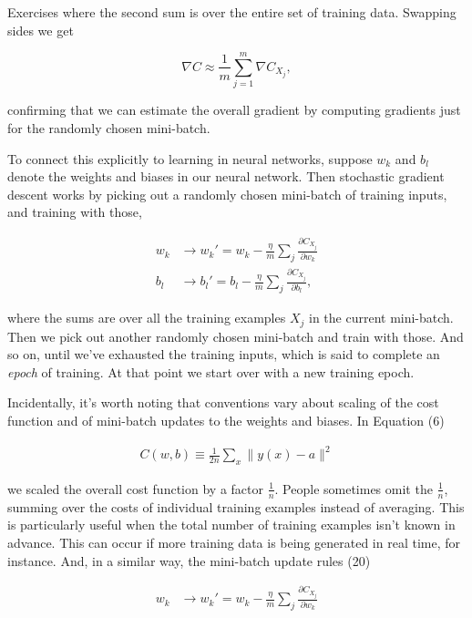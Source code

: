 \begin{exerciseBox}{Exercises}
\noindent where the second sum is over the entire set of training data. Swapping sides we get

\begin{equation}
\nabla C \approx \frac{1}{m} \sum_{j=1}^m \nabla C_{X_{j}},
\tag{19}
\end{equation}

\noindent confirming that we can estimate the overall gradient by computing gradients just for the randomly chosen mini-batch.


To connect this explicitly to learning in neural networks, suppose $w_k$ and $b_l$ denote the weights and biases in our neural network. Then stochastic gradient descent works by picking out a randomly chosen mini-batch of training inputs, and training with those,

\begin{align}
w_k &\rightarrow w_k' = w_k-\frac{\eta}{m} \sum_j \frac{\partial C_{X_j}}{\partial w_k} \tag{20} \\ b_l &\rightarrow b_l' = b_l-\frac{\eta}{m} \sum_j \frac{\partial C_{X_j}}{\partial b_l}, \tag{21}
\end{align}

\noindent where the sums are over all the training examples $X_j$ in the current mini-batch. Then we pick out another randomly chosen mini-batch and train with those. And so on, until we've exhausted the training inputs, which is said to complete an \emph{epoch} of training. At that point we start over with a new training epoch.


Incidentally, it's worth noting that conventions vary about scaling of the cost function and of mini-batch updates to the weights and biases. In Equation (6)

\begin{align*}
C(w,b) \equiv \frac{1}{2n} \sum_x \| y(x) - a\|^2 \nonumber
\end{align*}

\noindent we scaled the overall cost function by a factor $\frac{1}{n}$. People sometimes omit the $\frac{1}{n}$, summing over the costs of individual training examples instead of averaging. This is particularly useful when the total number of training examples isn't known in advance. This can occur if more training data is being generated in real time, for instance. And, in a similar way, the mini-batch update rules (20)

\begin{align*}
w_k &\rightarrow w_k' = w_k-\frac{\eta}{m} \sum_j \frac{\partial C_{X_j}}{\partial w_k} \nonumber
\end{align*}


\end{exerciseBox}

